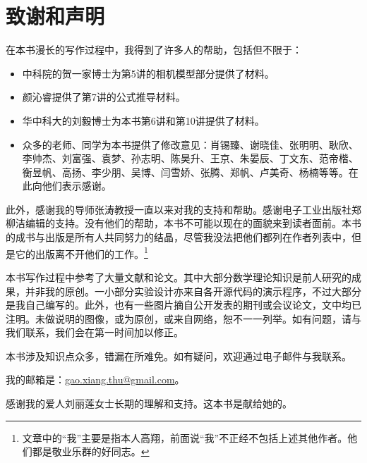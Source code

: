 \section{致谢和声明}
在本书漫长的写作过程中，我得到了许多人的帮助，包括但不限于：

\begin{itemize}
	\item 中科院的贺一家博士为第5讲的相机模型部分提供了材料。
	\item 颜沁睿提供了第7讲的公式推导材料。
	\item 华中科大的刘毅博士为本书第6讲和第10讲提供了材料。
	\item 众多的老师、同学为本书提供了修改意见：肖锡臻、谢晓佳、张明明、耿欣、李帅杰、刘富强、袁梦、孙志明、陈昊升、王京、朱晏辰、丁文东、范帝楷、衡昱帆、高扬、李少朋、吴博、闫雪娇、张腾、郑帆、卢美奇、杨楠等等。在此向他们表示感谢。
\end{itemize}

此外，感谢我的导师张涛教授一直以来对我的支持和帮助。感谢电子工业出版社郑柳洁编辑的支持。没有他们的帮助，本书不可能以现在的面貌来到读者面前。本书的成书与出版是所有人共同努力的结晶，尽管我没法把他们都列在作者列表中，但是它的出版离不开他们的工作。\footnote{文章中的“我”主要是指本人高翔，前面说“我”不正经不包括上述其他作者。他们都是敬业乐群的好同志。}

本书写作过程中参考了大量文献和论文。其中大部分数学理论知识是前人研究的成果，并非我的原创。一小部分实验设计亦来自各开源代码的演示程序，不过大部分是我自己编写的。此外，也有一些图片摘自公开发表的期刊或会议论文，文中均已注明。未做说明的图像，或为原创，或来自网络，恕不一一列举。如有问题，请与我们联系，我们会在第一时间加以修正。

本书涉及知识点众多，错漏在所难免。如有疑问，欢迎通过电子邮件与我联系。

我的邮箱是：\href{mailto:gao.xiang.thu@gmail.com}{gao.xiang.thu@gmail.com}。

感谢我的爱人刘丽莲女士长期的理解和支持。这本书是献给她的。

